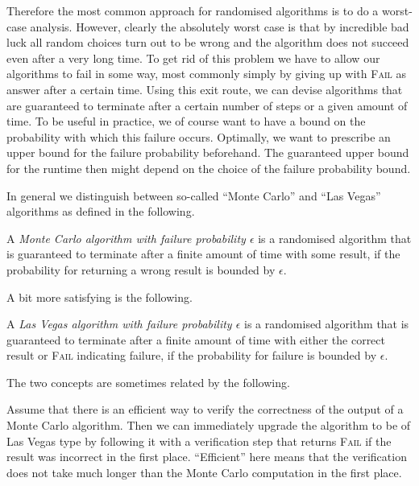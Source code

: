 Therefore the most common approach for randomised algorithms is to do a 
worst-case analysis. However, clearly the absolutely worst case is
that by incredible bad luck all random choices turn out to be wrong
and the algorithm does not succeed even after a very long time. To get
rid of this problem we have to allow our algorithms to fail in some
way, most commonly simply by giving up with \textsc{Fail} as answer
after a certain time.
Using this exit route, we can devise algorithms that are
guaranteed to terminate after a certain number of steps or a given
amount of time. To be useful in practice, we of course want to have a
bound on the probability with which this failure occurs. Optimally, we
want to prescribe an upper bound for the failure probability
beforehand. The guaranteed upper bound for the runtime then might
depend on the choice of the failure probability bound.

In general we distinguish between so-called ``Monte Carlo'' and
``Las Vegas'' algorithms as defined in the following.

\begin{Def}
%
%
    A \emph{Monte Carlo algorithm with failure probability $\epsilon$}
    is a randomised algorithm that is guaranteed to terminate after
    a finite amount of time with some result, if the probability for
    returning a wrong result is bounded by $\epsilon$.
\end{Def}

A bit more satisfying is the following.

\begin{Def}
%
%
    A \emph{Las Vegas algorithm with failure probability $\epsilon$}
    is a randomised algorithm that is guaranteed to terminate after
    a finite amount of time with either the correct result or
    \textsc{Fail} indicating failure, if the probability for failure
    is bounded by $\epsilon$.
\end{Def}

The two concepts are sometimes related by the following.

\begin{Rem}
%

Assume that there is an efficient way to verify the correctness of the output
of a Monte Carlo algorithm. Then we can immediately upgrade the
algorithm to be of Las Vegas type by following it with a verification
step that returns \textsc{Fail} if the result was incorrect in the first
place. ``Efficient'' here means that the verification does not take
much longer than the Monte Carlo computation in the first place.
\end{Rem}

